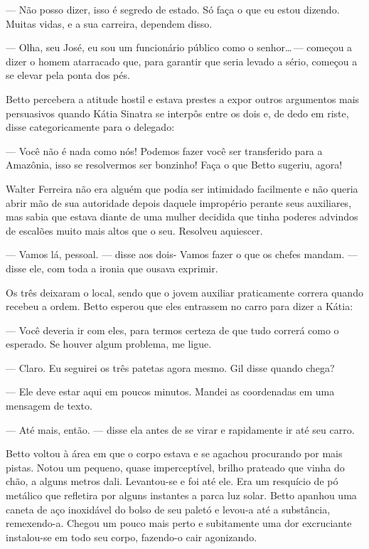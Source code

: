 --- Não posso dizer, isso é segredo de estado. Só faça o que eu estou
dizendo. Muitas vidas, e a sua carreira, dependem disso.

--- Olha, seu José, eu sou um funcionário público como o
senhor\ldots\,--- começou a dizer o homem atarracado que, para garantir
que seria levado a sério, começou a se elevar pela ponta dos pés.

Betto percebera a atitude hostil e estava prestes a expor outros
argumentos mais persuasivos quando Kátia Sinatra se interpôs entre os
dois e, de dedo em riste, disse categoricamente para o delegado:

--- Você não é nada como nós! Podemos fazer você ser transferido para a
Amazônia, isso se resolvermos ser bonzinho! Faça o que Betto sugeriu,
agora!

Walter Ferreira não era alguém que podia ser intimidado facilmente e não
queria abrir mão de sua autoridade depois daquele impropério perante
seus auxiliares, mas sabia que estava diante de uma mulher decidida que
tinha poderes advindos de escalões muito mais altos que o seu. Resolveu
aquiescer.

--- Vamos lá, pessoal. --- disse aos dois- Vamos fazer o que os chefes
mandam. --- disse ele, com toda a ironia que ousava exprimir.

Os três deixaram o local, sendo que o jovem auxiliar praticamente
correra quando recebeu a ordem. Betto esperou que eles entrassem no
carro para dizer a Kátia:

--- Você deveria ir com eles, para termos certeza de que tudo correrá
como o esperado. Se houver algum problema, me ligue.

--- Claro. Eu seguirei os três patetas agora mesmo. Gil disse quando
chega?

--- Ele deve estar aqui em poucos minutos. Mandei as coordenadas em uma
mensagem de texto.

--- Até mais, então. --- disse ela antes de se virar e rapidamente ir
até seu carro.

Betto voltou à área em que o corpo estava e se agachou procurando por
mais pistas. Notou um pequeno, quase imperceptível, brilho prateado que
vinha do chão, a alguns metros dali. Levantou-se e foi até ele. Era um
resquício de pó metálico que refletira por alguns instantes a parca luz
solar. Betto apanhou uma caneta de aço inoxidável do bolso de seu paletó
e levou-a até a substância, remexendo-a. Chegou um pouco mais perto e
subitamente uma dor excruciante instalou-se em todo seu corpo, fazendo-o
cair agonizando.

